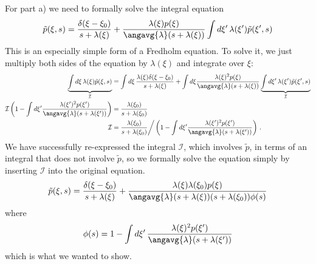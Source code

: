 


For part a) we need to formally solve the integral equation
\begin{equation}
  \tilde{p}(\xi, s)
  = \frac{\delta(\xi - \xi_0)}{s + \lambda(\xi)}
  + \frac{\lambda(\xi) p(\xi)}{\angavg{\lambda} (s + \lambda(\xi))}
  \int d\xi' \, \lambda(\xi') \tilde{p}(\xi', s)
\end{equation}
This is an especially simple form of a Fredholm equation.
To solve it, we just multiply both sides of the equation by $\lambda(\xi)$ and integrate over $\xi$:
\begin{align}
  \underbrace{\int d\xi \, \lambda(\xi) \tilde{p}(\xi, s)}_\mathcal{I}
  &= \int d\xi \, \frac{\lambda(\xi) \delta(\xi - \xi_0)}{s + \lambda(\xi)}
  + \int d\xi \frac{\lambda(\xi)^2 p(\xi)}{\angavg{\lambda}(s + \lambda(\xi))}
  \underbrace{\int d\xi' \, \lambda(\xi') \tilde{p}(\xi', s)}_\mathcal{I} \nonumber \\
  \mathcal{I}
  \left(
    1 - \int d\xi' \frac{\lambda(\xi')^2p(\xi')}{\angavg{\lambda}(s + \lambda(\xi'))}
  \right)
  &= \frac{\lambda(\xi_0)}{s + \lambda(\xi_0)} \nonumber \\
  \mathcal{I}
  &= \frac{\lambda(\xi_0)}{s + \lambda(\xi_0)}
  \bigg/
  \left(
    1 - \int d\xi' \frac{\lambda(\xi')^2p(\xi')}{\angavg{\lambda}(s + \lambda(\xi'))}
  \right) \nonumber
  \, .
\end{align}
We have successfully re-expressed the integral $\mathcal{I}$, which involves $\tilde{p}$, in terms of an integral that does not involve $\tilde{p}$, so we formally solve the equation simply by inserting $\mathcal{I}$ into the original equation.
\begin{equation}
  \tilde{p}(\xi, s)
  = \frac{\delta(\xi - \xi_0)}{s + \lambda(\xi)}
  + \frac{\lambda(\xi) \lambda(\xi_0) p(\xi)}{\angavg{\lambda}(s + \lambda(\xi))(s + \lambda(\xi_0))\phi(s)}
\end{equation}
where
\begin{equation}
  \phi(s)
  = 1 - \int d\xi' \, \frac{\lambda(\xi)^2 p(\xi')}{\angavg{\lambda} (s + \lambda(\xi'))}
\end{equation}
which is what we wanted to show.


